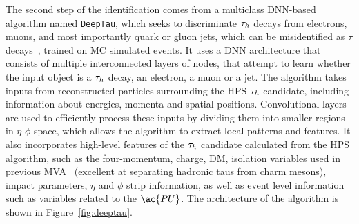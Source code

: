 The second step of the identification comes from a multiclass \ac{DNN}-based algorithm named \texttt{DeepTau}, which seeks to discriminate $\tau_{h}$ decays from electrons, muons, and most importantly quark or gluon jets, which can be misidentified as $\tau$ decays~\cite{CMS:2022prd}, trained on \ac{MC} simulated events.
It uses a \ac{DNN} architecture that consists of multiple interconnected layers of nodes, that attempt to learn whether the input object is a $\tau_{h}$ decay, an electron, a muon or a jet. 
The algorithm takes inputs from reconstructed particles surrounding the \ac{HPS} $\tau_{h}$ candidate, including information about energies, momenta and spatial positions. 
Convolutional layers are used to efficiently process these inputs by dividing them into smaller regions in $\eta$-$\phi$ space, which allows the algorithm to extract local patterns and features. 
It also incorporates high-level features of the $\tau_{h}$ candidate calculated from the \ac{HPS} algorithm, such as the four-momentum, charge, \ac{DM}, isolation variables used in previous \ac{MVA}~\cite{CMS:2018jrd} (excellent at separating hadronic taus from charm mesons), impact parameters, $\eta$ and $\phi$ strip information, as well as event level information such as variables related to the $\ac{PU}$.
The architecture of the algorithm is shown in Figure~\ref{fig:deeptau}. \\


